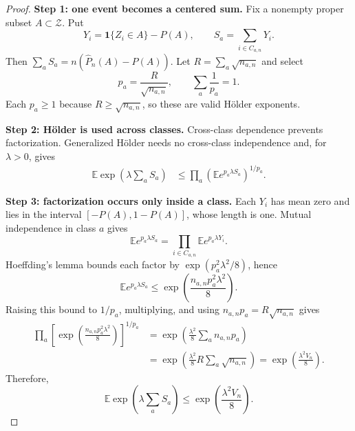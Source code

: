 \documentclass[11pt]{article}
\theoremstyle{definition}
\newcommand{\cZ}{\mathcal{Z}}
\newcommand{\Phat}{\widehat{P}}
\newcommand{\E}{\mathbb{E}}
\newcommand{\Ind}{\mathbf{1}}
\begin{document}
\begin{proof}
\medskip\noindent\textbf{Step 1: one event becomes a centered sum.}
Fix a nonempty proper subset $A\subset\cZ$.  Put
\begin{equation}
  Y_i=\Ind\{Z_i\in A\}-P(A),
  \qquad
  S_a=\sum_{i\in C_{a,n}}Y_i.
\end{equation}
Then $\sum_aS_a=n(\Phat_n(A)-P(A))$.  Let
$R=\sum_a\sqrt{n_{a,n}}$ and select
\begin{equation}
  p_a=\frac{R}{\sqrt{n_{a,n}}},
  \qquad
  \sum_a\frac1{p_a}=1.
\end{equation}
Each $p_a\ge1$ because $R\ge\sqrt{n_{a,n}}$, so these are valid H{\"o}lder exponents.

\medskip\noindent\textbf{Step 2: H{\"o}lder is used across classes.}
Cross-class dependence prevents factorization.  Generalized H{\"o}lder needs no cross-class
independence and, for $\lambda>0$, gives
\begin{align}
  \E\exp\!\left(\lambda\sum_aS_a\right)
  &\le
  \prod_a\left(\E e^{p_a\lambda S_a}\right)^{1/p_a}.
\end{align}

\medskip\noindent\textbf{Step 3: factorization occurs only inside a class.}
Each $Y_i$ has mean zero and lies in the interval $[-P(A),1-P(A)]$, whose length is one.
Mutual independence in class $a$ gives
\begin{equation}
  \E e^{p_a\lambda S_a}
  =\prod_{i\in C_{a,n}}\E e^{p_a\lambda Y_i}.
\end{equation}
Hoeffding's lemma bounds each factor by $\exp(p_a^2\lambda^2/8)$, hence
\begin{equation}
  \E e^{p_a\lambda S_a}
  \le
  \exp\!\left(\frac{n_{a,n}p_a^2\lambda^2}{8}\right).
\end{equation}
Raising this bound to $1/p_a$, multiplying, and using
$n_{a,n}p_a=R\sqrt{n_{a,n}}$ gives
\begin{align}
  \prod_a
  \left[
    \exp\!\left(\frac{n_{a,n}p_a^2\lambda^2}{8}\right)
  \right]^{1/p_a}
  &=
  \exp\!\left(\frac{\lambda^2}{8}\sum_an_{a,n}p_a\right)\\
  &=
  \exp\!\left(\frac{\lambda^2}{8}R\sum_a\sqrt{n_{a,n}}\right)
  =
  \exp\!\left(\frac{\lambda^2V_n}{8}\right).
\end{align}
Therefore,
\begin{equation}\label{eq:mgf}
  \E\exp\!\left(\lambda\sum_aS_a\right)
  \le
  \exp\!\left(\frac{\lambda^2V_n}{8}\right).
\end{equation}


\end{proof}
\end{document}
